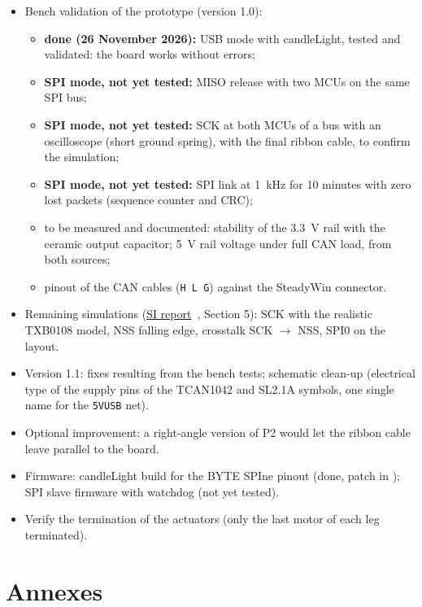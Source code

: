 \documentclass[11pt,a4paper]{article}
\newcommand{\net}[1]{\texttt{#1}}
\newcommand{\sireport}{\href{run:BYTE_SPIne_SI_Simulation.pdf}{SI report}~\cite{si}}
\begin{document}
\begin{itemize}
    \item Bench validation of the prototype (version 1.0):
    \begin{itemize}[label=--]
        \item \textbf{done (26 November 2026):} USB mode with candleLight, tested and validated: the board
        works without errors;
        \item \textbf{SPI mode, not yet tested:} MISO release with two MCUs on the same SPI bus;
        \item \textbf{SPI mode, not yet tested:} SCK at both MCUs of a bus with an oscilloscope (short ground
        spring), with the final ribbon cable, to confirm the simulation;
        \item \textbf{SPI mode, not yet tested:} SPI link at \qty{1}{kHz} for 10 minutes with zero lost packets
        (sequence counter and CRC);
        \item to be measured and documented: stability of the \qty{3.3}{V} rail with the ceramic output capacitor;
        \qty{5}{V} rail voltage under full CAN load, from both sources;
        \item pinout of the CAN cables (\texttt{H L G}) against the SteadyWin connector.
    \end{itemize}
    \item Remaining simulations (\sireport, Section 5): SCK with the realistic TXB0108 model,
    NSS falling edge, crosstalk SCK $\to$ NSS, SPI0 on the layout.
    \item Version 1.1: fixes resulting from the bench tests; schematic clean-up (electrical type of the
    supply pins of the TCAN1042 and SL2.1A symbols, one single name for the \net{5VUSB} net).
    \item Optional improvement: a right-angle version of P2 would let the ribbon cable leave parallel
    to the board.
    \item Firmware: candleLight build for the BYTE SPIne pinout (done, patch in
    ); SPI slave firmware with watchdog
    (not yet tested).
    \item Verify the termination of the actuators (only the last motor of each leg terminated).
\end{itemize}

\section{Annexes}
\end{document}
